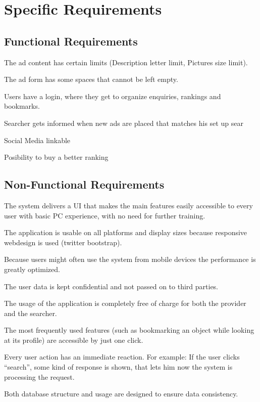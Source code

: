 \documentclass{scrreprt}
\begin{document}
\chapter{Specific Requirements}
\section{Functional Requirements}
\begin{list}{•}
\item The ad content has certain limits (Description letter limit, Pictures size limit).
\item The ad form has some spaces that cannot be left empty.
\item Users have a login, where they get to organize enquiries, rankings and bookmarks.
\item Searcher gets informed when new ads are placed that matches his set up sear
\item Social Media linkable	
\item Posibility to buy a better ranking 
\end{list}


\section{Non-Functional Requirements}
\begin{list}{•}
\item The system delivers a UI that makes the main features easily accessible to every user with basic PC experience, with no need for further training.
\item The application is usable on all platforms and display sizes because responsive webdesign is used (twitter bootstrap).
\item Because users might often use the system from mobile devices the performance is greatly optimized.
\item The user data is kept confidential and not passed on to third parties.
\item The usage of the application is completely free of charge for both the provider and the searcher.
\item The most frequently used features (such as bookmarking an object while looking at its profile) are accessible by just one click.
\item Every user action has an immediate reaction. For example: If the user clicks “search”, some kind of response is shown, that lets him now the system is processing the request.
\item Both database structure and usage are designed to ensure data consistency.
\end{list}
\end{document}
